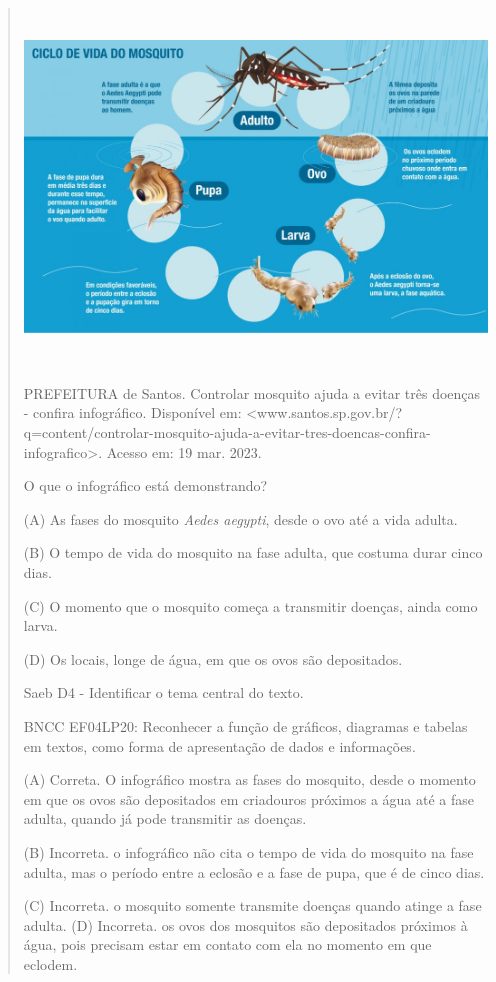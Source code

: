 \begin{escolha}
\begin{quote}
\includegraphics[width=5.90556in,height=3.72118in]{media/image37.jpeg}

PREFEITURA de Santos. Controlar mosquito ajuda a evitar três doenças -
confira infográfico. Disponível em:
\textless{}www.santos.sp.gov.br/?q=content/controlar-mosquito-ajuda-a-evitar-tres-doencas-confira-infografico\textgreater{}.
Acesso em: 19 mar. 2023.

\protect\hypertarget{_Hlk128465624}{}{}O que o infográfico está
demonstrando?

(A) As fases do mosquito \emph{Aedes aegypti}, desde o ovo até a vida
adulta.

(B) O tempo de vida do mosquito na fase adulta, que costuma durar cinco
dias.

(C) O momento que o mosquito começa a transmitir doenças, ainda como
larva.

(D) Os locais, longe de água, em que os ovos são depositados.

Saeb D4 - Identificar o tema central do texto.

BNCC EF04LP20: Reconhecer a função de gráficos, diagramas e tabelas em
textos, como forma de apresentação de dados e informações.

(A) Correta. O infográfico mostra as fases do mosquito, desde o momento
em que os ovos são depositados em criadouros próximos a água até a fase
adulta, quando já pode transmitir as doenças.

(B) Incorreta. o infográfico não cita o tempo de vida do mosquito na
fase adulta, mas o período entre a eclosão e a fase de pupa, que é de
cinco dias.

(C) Incorreta. o mosquito somente transmite doenças quando atinge a fase
adulta. (D) Incorreta. os ovos dos mosquitos são depositados próximos à
água, pois precisam estar em contato com ela no momento em que eclodem.
\end{quote}


\end{escolha}
